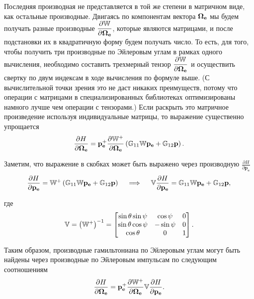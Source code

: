 \documentclass[12pt]{article}
\newcommand{\mf}{\mathbf}
\newcommand{\lb}{\left(}
\newcommand{\rb}{\right)}
\newcommand{\bbG}{\mathbb{G}}
\newcommand{\bbV}{\mathbb{V}}
\newcommand{\bbW}{\mathbb{W}}
\newcommand{\EOmega}{\boldsymbol{\Omega}_{\rm \textbf{e}}}
\newcommand{\mfpe}{\mf{p_e}}
\newcommand{\mfpet}{\mf{p_e^+}}
\newcommand{\mfp}{\mf{p}}
\begin{document}
Последняя производная не представляется в той же степени в матричном виде, как остальные производные. Двигаясь по компонентам вектора $\EOmega$ мы будем получать разные производные $\displaystyle \frac{\partial \bbW}{\partial \EOmega}$, которые являются матрицами, и после подстановки их в квадратичную форму будем получать число. То есть, для того, чтобы получить три производные по Эйлеровым углам в рамках одного вычисления, необходимо составить трехмерный тензор $\displaystyle \frac{\partial \bbW}{\partial \EOmega}$ и осуществить свертку по двум индексам в ходе вычисления по формуле выше. (С вычислительной точки зрения это не даст никаких преимуществ, потому что операции с матрицами в специализированных библиотеках оптимизированы намного лучше чем операции с тензорами.) Если раскрыть это матричное произведение используя индивидуальные матрицы, то выражение существенно упрощается
\begin{gather}
    \frac{\partial H}{\partial \EOmega} = \mfpet \frac{\partial \bbW^+}{\partial \EOmega} \lb \bbG_{11} \bbW \mfpe + \bbG_{12} \mfp \rb \notag.
\end{gather}

Заметим, что выражение в скобках может быть выражено через производную $\displaystyle \frac{\partial H}{\partial \mfpe}$
\begin{gather}
    \frac{\partial H}{\partial \mfpe} = \bbW^+ \lb \bbG_{11} \bbW \mfpe + \bbG_{12} \mfp \rb \quad \implies \quad 
    \bbV \frac{\partial H}{\partial \mfpe} = \bbG_{11} \bbW \mfpe + \bbG_{12} \mfp, \notag
\end{gather}

где
\begin{gather}
    \bbV = \lb \bbW^+ \rb^{-1} = 
    \begin{bmatrix}
        \sin \theta \sin \psi & \cos \psi & 0 \\
        \sin \theta \cos \psi & -\sin \psi & 0 \\
        \cos \theta & 0 & 1
    \end{bmatrix}. \notag
\end{gather}

Таким образом, производные гамильтониана по Эйлеровым углам могут быть найдены через производные по Эйлеровым импульсам по следующим соотношениям
\begin{gather}
    \frac{\partial H}{\partial \EOmega} = \mfpet \frac{\partial \bbW^+}{\partial \EOmega} \bbV \frac{\partial H}{\partial \mfpe}. \notag 
\end{gather}
\end{document}
